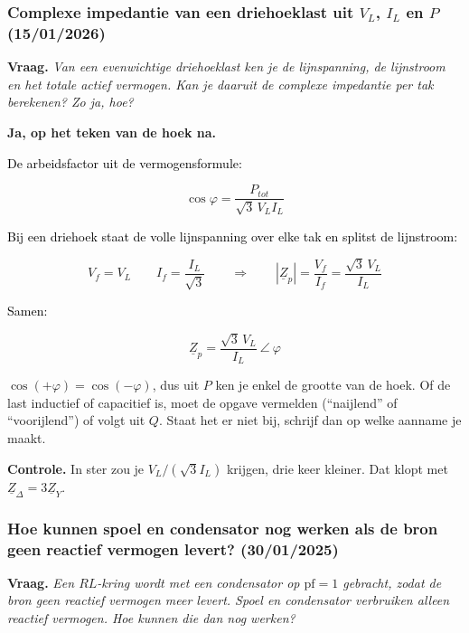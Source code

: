 \documentclass[a4paper,11pt]{article}
\newcommand{\stapreden}[1]{\par\vspace{1.4mm}\noindent\textcolor{black}{#1}\par\vspace{-2mm}}
\begin{document}
\subsubsection{Complexe impedantie van een driehoeklast uit $V_L$, $I_L$ en $P$ (15/01/2026)}

\textbf{Vraag.} \textit{Van een evenwichtige driehoeklast ken je de lijnspanning, de lijnstroom en
    het totale actief vermogen. Kan je daaruit de complexe impedantie per tak berekenen? Zo ja, hoe?}

\begin{oefenblok}[Antwoord]
    \textbf{Ja, op het teken van de hoek na.}

    \stapreden{De arbeidsfactor uit de vermogensformule:}
    \[\cos\varphi = \frac{P_{tot}}{\sqrt3\,V_L I_L}\]

    \stapreden{Bij een driehoek staat de volle lijnspanning over elke tak en splitst de lijnstroom:}
    \[V_f = V_L \qquad I_f = \frac{I_L}{\sqrt3}
        \qquad\Longrightarrow\qquad
        |\underline{Z}_p| = \frac{V_f}{I_f} = \frac{\sqrt3\,V_L}{I_L}\]

    \stapreden{Samen:}
    \[\underline{Z}_p = \frac{\sqrt3\,V_L}{I_L}\ \angle\ \varphi\]

    \begin{waarschuwing}
        $\cos(+\varphi) = \cos(-\varphi)$, dus uit $P$ ken je enkel de grootte van de hoek. Of de
        last inductief of capacitief is, moet de opgave vermelden (``naijlend'' of ``voorijlend'')
        of volgt uit $Q$. Staat het er niet bij, schrijf dan op welke aanname je maakt.
    \end{waarschuwing}

    \textbf{Controle.} In ster zou je $V_L/(\sqrt3 I_L)$ krijgen, drie keer kleiner. Dat klopt met
    $\underline{Z}_\Delta = 3\underline{Z}_Y$.
\end{oefenblok}

\subsubsection{Hoe kunnen spoel en condensator nog werken als de bron geen reactief vermogen levert? (30/01/2025)}

\textbf{Vraag.} \textit{Een $RL$-kring wordt met een condensator op $\text{pf} = 1$ gebracht, zodat
    de bron geen reactief vermogen meer levert. Spoel en condensator verbruiken alleen reactief
    vermogen. Hoe kunnen die dan nog werken?}
\end{document}
